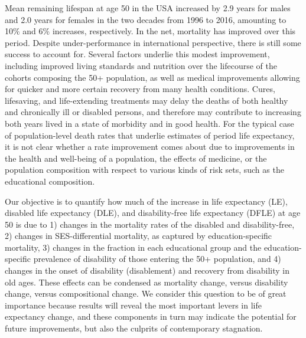 Mean remaining lifespan at age 50 in the USA increased by 2.9 years for males and 2.0 years for females in the two decades from 1996 to 2016, amounting to 10\% and 6\% increases, respectively. In the net, mortality has improved over this period. Despite under-performance in international perspective, there is still some success to account for. Several factors underlie this modest improvement, including improved living standards and nutrition over the lifecourse of the cohorts composing the 50+ population, as well as medical improvements allowing for quicker and more certain recovery from many health conditions. Cures, lifesaving, and life-extending treatments may delay the deaths of both healthy and chronically ill or disabled persons, and therefore may contribute to increasing both years lived in a state of morbidity and in good health. For the typical case of population-level death rates that underlie estimates of period life expectancy, it is not clear whether a rate improvement comes about due to improvements in the health and well-being of a population, the effects of medicine, or the population composition with respect to various kinds of risk sets, such as the educational composition. 

Our objective is to quantify how much of the increase in life expectancy (LE), disabled life expectancy (DLE), and disability-free life expectancy (DFLE) at age 50 is due to 1) changes in the mortality rates of the disabled and disability-free, 2) changes in SES-differential mortality, as captured by education-specific mortality, 3) changes in the fraction in each educational group and the education-specific prevalence of disability of those entering the 50+ population, and 4) changes in the onset of disability (disablement) and recovery from disability in old ages. These effects can be condensed as mortality change, versus disability change, versus compositional change. We consider this question to be of great importance because results will reveal the most important levers in life expectancy change, and these components in turn may indicate the potential for future improvements, but also the culprits of contemporary stagnation. 

